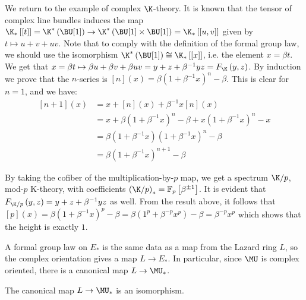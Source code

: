 \begin{example*}
	We return to the example of complex $\K$-theory.
	It is known that the tensor of complex line bundles induces the map
	$
	\K_*\left[\left[t\right]\right]
	= \K^*\left(\BU[1]\right)
	\to \K^*\left(\BU[1] \times \BU[1]\right)
	= \K_*\left[\left[u,v\right]\right]
	$
	given by $t \mapsto u + v + u v$.
	Note that to comply with the definition of the formal group law, we should use the isomorphism
	$\K^*\left(\BU[1]\right) \cong \K_* \left[\left[x\right]\right]$,
	i.e. the element $x = \beta t$.
	We get that $x = \beta t \mapsto \beta u + \beta v + \beta u v = y + z + \beta^{-1} y z = F_{\K}\left(y,z\right)$.
	By induction we prove that the $n$-series is $\left[n\right]\left(x\right) = \beta \left(1 + \beta^{-1} x\right)^n - \beta$.
	This is clear for $n = 1$, and we have:
	\begin{align*} 
		\left[n+1\right]\left(x\right)
		&= x + \left[n\right]\left(x\right) + \beta^{-1} x \left[n\right]\left(x\right)\\
		&= x + \beta \left(1 + \beta^{-1} x\right)^n - \beta + x \left(1 + \beta^{-1} x\right)^n - x\\
		&= \beta \left(1 + \beta^{-1} x\right) \left(1 + \beta^{-1} x\right)^n - \beta\\
		&= \beta \left(1 + \beta^{-1} x\right)^{n+1} - \beta
	\end{align*}
\end{example*}

\begin{example*}
	By taking the cofiber of the multiplication-by-$p$ map, we get a spectrum $\K/p$, mod-$p$ K-theory, with coefficients $\left(\K/p\right)_* = \mathbb{F}_p \left[\beta^{\pm 1}\right]$.
	It is evident that $F_{\K/p}\left(y,z\right) = y + z + \beta^{-1} y z$ as well.
	From the result above, it follows that
	$
	\left[p\right]\left(x\right)
	= \beta \left(1 + \beta^{-1} x\right)^p - \beta
	= \beta \left(1^p + \beta^{-p} x^p\right) - \beta
	= \beta^{-p} x^p
	$
	which shows that the height is exactly $1$.
\end{example*}

A formal group law on $E_*$ is the same data as a map from the Lazard ring $L$, so the complex orientation gives a map $L \to E_*$.
In particular, since $\MU$ is complex oriented, there is a canonical map $L \to \MU_*$.

\begin{theorem}
	The canonical map $L \to \MU_*$ is an isomorphism.
\end{theorem}



